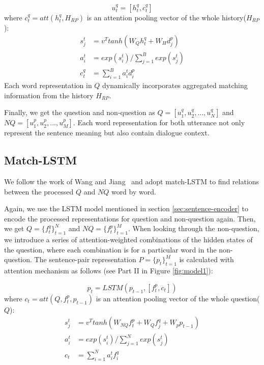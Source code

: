 \begin{equation}
    u^q_t=[h^q_t,c^q_t]
\end{equation}
where $c^q_t=att(h^q_t,H_{RP})$ is an attention pooling vector of the whole history($H_{RP}$):
\begin{equation}
\begin{aligned}
s^t_j&=v^Ttanh(W_Qh^q_t+W_Hd^p_j)\\
a^t_i&=exp(s^t_i)/\sum_{j=1}^Bexp(s^t_j)\\
c^q_t&=\sum_{i=1}^Ba^t_id^p_i
\end{aligned}
\end{equation}
Each word representation in $Q$ dynamically incorporates aggregated matching information from the history $H_{RP}$.

Finally, we get the question and non-question as  $Q=[u^q_1,u^q_2,...,u^q_N]$ and $NQ=[u^p_1,u^p_2,...,u^p_M]$. Each word representation for both utterance not only represent the sentence meaning but also contain dialogue context.



\subsection{Match-LSTM}
We follow the work of Wang and Jiang~ and adopt match-LSTM to find relations between the processed $Q$ and $NQ$ word by word.

Again, we use the LSTM model mentioned in section \ref{sec:sentence-encoder} to encode the processed representations for question and non-question again. Then, we get $Q=\{f^q_t\}_{t=1}^{N}$ and $NQ=\{f^p_t\}_{t=1}^{M}$. When looking through the non-question, we introduce a series of attention-weighted combinations of the hidden states of the question, where each combination is for a particular word in the non-question. The sentence-pair representation $P=\{p_t\}_{t=1}^{M}$ is calculated with attention mechanism as follows (see Part II in Figure \ref{fig:model1}):

\begin{equation}
    p_t=LSTM(p_{t-1},[f^p_t,c_t])
\end{equation}
where $c_t=att(Q,f^p_t,p_{t-1})$ is an attention pooling vector of the whole question($Q$):
\begin{equation}
\begin{aligned}
s^t_j&=v^Ttanh(W_{NQ}f^p_t+W_Qf^q_j+W_pp_{t-1})\\
a^t_i&=exp(s^t_i)/\sum_{j=1}^Nexp(s^t_j)\\
c_t&=\sum_{i=1}^Na^t_if^q_i
\end{aligned}
\end{equation}

